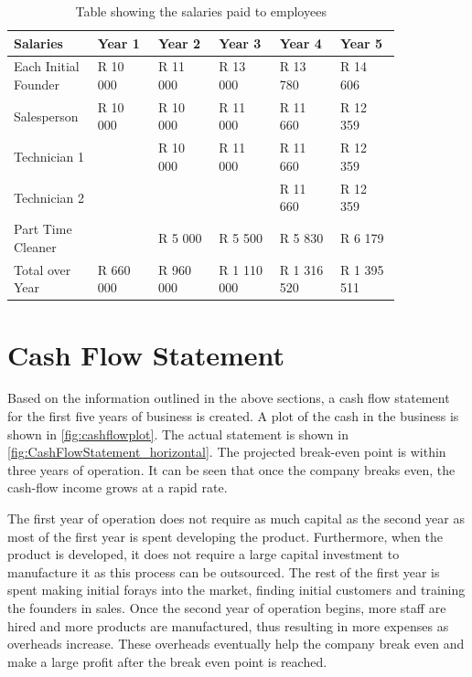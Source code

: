 \begin{table}[htbp]
  \centering
  \caption{Table showing the salaries paid to employees}
    \begin{tabular}{p{0.14\linewidth}p{0.14\linewidth}p{0.14\linewidth}p{0.14\linewidth}p{0.14\linewidth}p{0.14\linewidth}}
    \toprule
    Salaries & Year 1 & Year 2 & Year 3 & Year 4 & Year 5 \\
    \midrule
    \raggedright{Each Initial Founder} & R 10 000 & R 11 000 & R 13 000 & R 13 780 & R 14 606 \\
    Salesperson & R 10 000 & R 10 000 & R 11 000 & R 11 660 & R 12 359 \\
    Technician 1 &       & R 10 000 & R 11 000 & R 11 660 & R 12 359 \\
    Technician 2 &       &       &       & R 11 660 & R 12 359 \\
    \raggedright{Part Time Cleaner}&       & R 5 000 & R 5 500 & R 5 830 & R 6 179 \\
    \midrule
    \raggedright{Total over Year} & R 660 000 & R 960 000 & R 1 110 000 & R 1 316 520 & R 1 395 511 \\
    \bottomrule
    \end{tabular}%
  \label{tab:salaries}%
\end{table}%

\section{Cash Flow Statement}
Based on the information outlined in the above sections, a cash flow statement for the first five years of business is created. A plot of the cash in the business is shown in \cref{fig:cashflowplot}. The actual statement is shown in \cref{fig:CashFlowStatement_horizontal}. The projected break-even point is within three years of operation. It can be seen that once the company breaks even, the cash-flow income grows at a rapid rate.

The first year of operation does not require as much capital as the second year as most of the first year is spent developing the product. Furthermore, when the product is developed, it does not require a large capital investment to manufacture it as this process can be outsourced. The rest of the first year is spent making initial forays into the market, finding initial customers and training the founders in sales. Once the second year of operation begins, more staff are hired and more products are manufactured, thus resulting in more expenses as overheads increase. These overheads eventually help the company break even and make a large profit after the break even point is reached.

